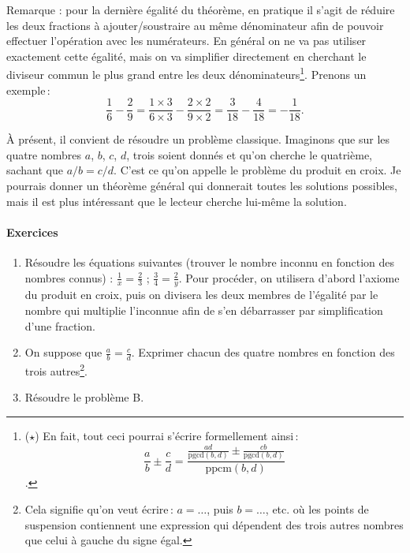 		Remarque : pour la dernière égalité du théorème, en pratique il s'agit de réduire les deux fractions à ajouter/soustraire au même dénominateur afin de pouvoir effectuer l'opération avec les numérateurs. En général on ne va pas utiliser exactement cette égalité, mais on va simplifier directement en cherchant le diviseur commun le plus grand entre les deux dénominateurs\footnote{($\star$) En fait, tout ceci pourrai s'écrire formellement ainsi\,:
		\begin{equation}
			\frac{a}{b}\pm\frac{c}{d}=\frac{\frac{ad}{\mathrm{pgcd}(b,d)}\pm \frac{cb}{\mathrm{pgcd}(b,d)}}{\mathrm{ppcm}(b,d)}
		\end{equation}.}. Prenons un exemple\,:
		\begin{equation}
			\frac{1}{6}-\frac{2}{9}=\frac{1\times 3}{6\times 3}-\frac{2\times 2}{9\times 2}=\frac{3}{18}-\frac{4}{18}=-\frac{1}{18}.
		\end{equation}

		À présent, il convient de résoudre un problème classique. Imaginons que sur les quatre nombres $a$, $b$, $c$, $d$, trois soient donnés et qu'on cherche le quatrième, sachant que $a/b=c/d$. C'est ce qu'on appelle le problème du produit en croix. Je pourrais donner un théorème général qui donnerait toutes les solutions possibles, mais il est plus intéressant que le lecteur cherche lui-même la solution.


	\paragraph{Exercices}
	\begin{enumerate}
		\item Résoudre les équations suivantes (trouver le nombre inconnu en fonction des nombres connus) : $\frac{1}{x}=\frac{2}{3}$ ; $\frac{3}{4}=\frac{2}{y}$. Pour procéder, on utilisera d'abord l'axiome du produit en croix, puis on divisera les deux membres de l'égalité par le nombre qui multiplie l'inconnue afin de s'en débarrasser par simplification d'une fraction.

		\item On suppose que $\frac{a}{b}=\frac{c}{d}$. Exprimer chacun des quatre nombres en fonction des trois autres\footnote{Cela signifie qu'on veut écrire\,: $a=\ldots$, puis $b=\ldots$, etc. où les points de suspension contiennent une expression qui dépendent des trois autres nombres que celui à gauche du signe égal.}.

		\item Résoudre le problème B.
	\end{enumerate}

